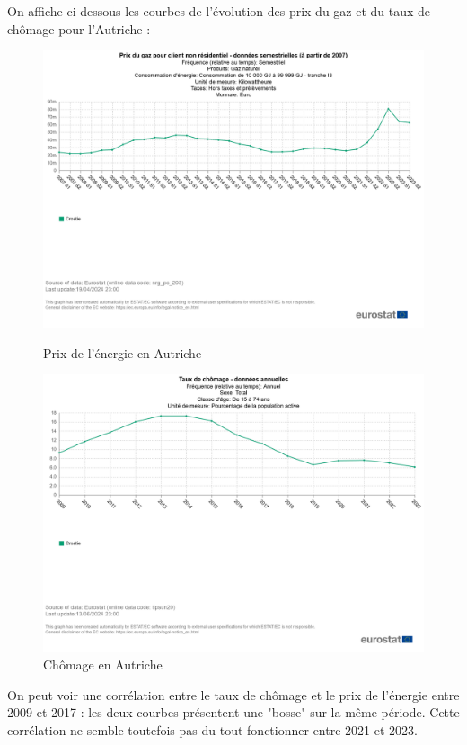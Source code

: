 \documentclass{article}
\begin{document}
On affiche ci-dessous les courbes de l'évolution des prix du gaz et du taux de chômage pour l'Autriche :
\begin{figure}[H]
  \centering
  \begin{minipage}{0.45\textwidth}
      \centering
      \includegraphics[width=\textwidth]{"autriche_1.png"}
      \caption{Prix de l'énergie en Autriche}
  \end{minipage}\hfill
  \centering
  \begin{minipage}{0.45\textwidth}
      \centering
      \includegraphics[width=\textwidth]{"autriche_2.png"}
      \caption{Chômage en Autriche}
  \end{minipage}
\end{figure}

On peut voir une corrélation entre le taux de chômage et le prix de l'énergie entre 2009 et 2017 : les deux courbes présentent une "bosse" sur la même période. Cette corrélation ne semble toutefois pas du tout fonctionner entre 2021 et 2023.
\end{document}
